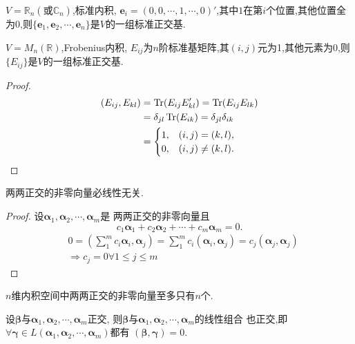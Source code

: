 \begin{example}
  $V=\mathbb{R}_n(\text{或}\mathbb{C}_n)$,标准内积, $\bm{e}_i=(0,0,\cdots,1,\cdots,0)'$,其中$1$在第$i$个位置,其他位置全为0,则$\{\bm{e}_1,\bm{e}_2,\cdots,\bm{e}_n\}$是$V$的一组标准正交基.
\end{example}

\begin{example}
$V=M_n(\mathbb{R})$,Frobenius内积, $E_{ij}$为$n$阶标准基矩阵,其$(i,j)$元为1,其他元素为0,则$\{E_{ij}\}$是$V$的一组标准正交基. 
\end{example}

\begin{proof}
  \begin{align*}
    (E_{ij},E_{kl}) & = \operatorname{Tr}(E_{ij}E_{kl}') = \operatorname{Tr}(E_{ij}E_{lk})\\
    & = \delta_{jl}\operatorname{Tr}(E_{ik}) = \delta_{jl}\delta_{ik}\\ 
    & = \begin{cases}
      1, & (i,j)=(k,l),\\
      0, & (i,j)\neq (k,l).
      \end{cases}
  \end{align*}
\end{proof}

\begin{theory}
  两两正交的非零向量必线性无关.
\end{theory}

\begin{proof}
  设$\bm{\alpha}_1, \bm{\alpha}_2, \cdots, \bm{\alpha}_m$是
  两两正交的非零向量且
  \[
  c_1\bm{\alpha}_1+c_2\bm{\alpha}_2+\cdots+c_m\bm{\alpha}_m=0.
  \]
  \begin{align*}
    & 0 = (\sum_1^m c_i\bm{\alpha}_i,\bm{\alpha}_j) 
    = \sum_1^m c_i(\bm{\alpha}_i, \bm{\alpha}_j) 
    = c_j(\bm{\alpha}_j, \bm{\alpha}_j)\\
    & \Longrightarrow c_j =0 \forall 1 \leq j \leq m
  \end{align*}
\end{proof}

\begin{deduction}
  $n$维内积空间中两两正交的非零向量至多只有$n$个.
\end{deduction}

\begin{theory}
  设$\bm{\beta}$与$\bm{\alpha}_1,\bm{\alpha}_2,\cdots,\bm{\alpha}_m$正交,
  则$\bm{\beta}$与$\bm{\alpha}_1,\bm{\alpha}_2,\cdots,\bm{\alpha}_m$的线性组合
 也正交,即
  $\forall \bm{\gamma}\in L(\bm{\alpha}_1,\bm{\alpha}_2,\cdots,\bm{\alpha}_m)$都有
  $(\bm{\beta},\bm{\gamma})=0$.
\end{theory}


